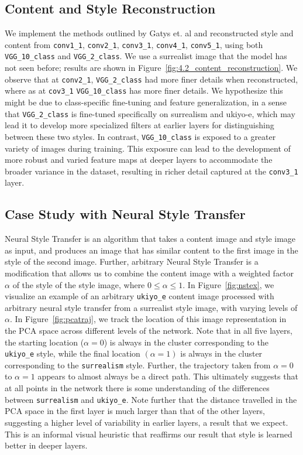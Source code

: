 \documentclass[twocolumn]{article}
\begin{document}
\subsection{Content and Style Reconstruction}
We implement the methods outlined by Gatys et. al \cite{gatysNeuralAlgorithmArtistic2015} and reconstructed style and content from \verb|conv1_1|, \verb|conv2_1|, \verb|conv3_1|, \verb|conv4_1|, \verb|conv5_1|, using both \verb|VGG_10_class| and \verb|VGG_2_class|. We use a surrealist image that the model has not seen before; results are shown in Figure~\ref{fig:4.2_content_reconstruction}. We observe that at \verb|conv2_1|, \verb|VGG_2_class| had more finer details when reconstructed, where as at \verb|cov3_1| \verb|VGG_10_class| has more finer details. We hypothesize this might be due to class-specific fine-tuning and feature generalization, in a sense that \verb|VGG_2_class| is fine-tuned specifically on surrealism and ukiyo-e, which may lead it to develop more specialized filters at earlier layers for distinguishing between these two styles. In contrast, \verb|VGG_10_class| is exposed to a greater variety of images during training. This exposure can lead to the development of more robust and varied feature maps at deeper layers to accommodate the broader variance in the dataset, resulting in richer detail captured at the \verb|conv3_1| layer.

\subsection{Case Study with Neural Style Transfer}\label{sec:casestudy}

Neural Style Transfer \cite{gatysNeuralAlgorithmArtistic2015} is an algorithm that takes a content image and style image as input, and produces an image that has similar content to the first image in the style of the second image. Further, arbitrary Neural Style Transfer \cite{arbitrarynst} is a modification that allows us to combine the content image with a weighted factor $\alpha$ of the style of the style image, where $0\leq \alpha\leq 1$. In Figure~\ref{fig:nstex}, we visualize an example of an arbitrary \verb|ukiyo_e| content image processed with arbitrary neural style transfer from a surrealist style image, with varying levels of $\alpha$. In Figure~\ref{fig:pcatraj}, we track the location of this image representation in the PCA space across different levels of the network. Note that in all five layers, the starting location ($\alpha=0$) is always in the cluster corresponding to the \verb|ukiyo_e| style, while the final location $(\alpha=1)$ is always in the cluster corresponding to the \verb|surrealism| style. Further, the trajectory taken from $\alpha=0$ to $\alpha=1$ appears to almost always be a direct path. This ultimately suggests that at all points in the network there is some understanding of the differences between \verb|surrealism| and \verb|ukiyo_e|. Note further that the distance travelled in the PCA space in the first layer is much larger than that of the other layers, suggesting a higher level of variability in earlier layers, a result that we expect. This is an informal visual heuristic that reaffirms our result that style is learned better in deeper layers. 
\end{document}
